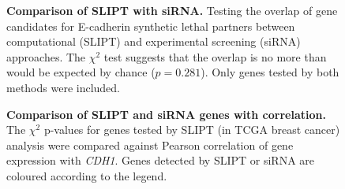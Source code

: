 \begin{figure}[!p]
  \centering
    \caption[Comparison of SLIPT with siRNA]{\small \textbf{Comparison of \gls{SLIPT} with \gls{siRNA}.} Testing the overlap of gene candidates for \gls{E-cadherin} \gls{synthetic lethal} partners between computational (\gls{SLIPT}) and experimental screening (\gls{siRNA}) approaches. The $\chi^2$ test suggests that the overlap is no more than would be expected by chance ($p = 0.281$).  Only genes tested by both methods were included. %
}
\label{fig:Venn_allgenes}
\end{figure}



\begin{figure}[!p]
\begin{center}
   \end{center}
   \caption[Comparison of  SLIPT and siRNA genes with correlation]{\small \textbf{Comparison of  \gls{SLIPT} and \gls{siRNA} genes with correlation.} The $\chi^2$ p-values for genes tested by \gls{SLIPT} (in \gls{TCGA} breast cancer)  analysis were compared against Pearson correlation of \gls{gene expression} with \textit{CDH1}. Genes detected by \gls{SLIPT} or \gls{siRNA} are coloured according to the legend. 
}
\label{fig:compare_points_correlation_SL}
\end{figure}


